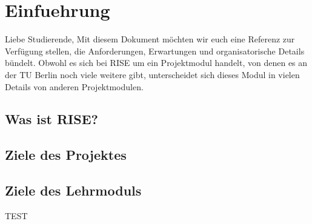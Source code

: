 \section{Einfuehrung}

Liebe Studierende,
Mit diesem Dokument möchten wir euch eine Referenz zur Verfügung stellen, die Anforderungen, Erwartungen und organisatorische Details bündelt. Obwohl es sich bei RISE um ein Projektmodul handelt, von denen es an der TU Berlin noch viele weitere gibt, unterscheidet sich dieses Modul in vielen Details von anderen Projektmodulen. 

\subsection{Was ist RISE?}

\subsection{Ziele des Projektes}

\subsection{Ziele des Lehrmoduls}

TEST

\newpage
